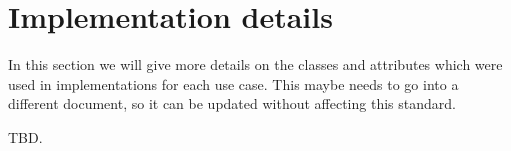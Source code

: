 \documentclass[11pt,a4paper]{ivoa}
\begin{document}
\section{Implementation details}\label{sec:implementation-details}
In this section we will give more details on the classes and attributes which were used 
in implementations for each use case. This maybe needs to go into a different document, so it can 
be updated without affecting this standard.

TBD.



\end{document}
